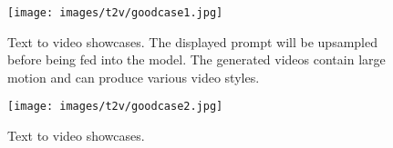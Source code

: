 \documentclass{article} \usepackage{iclr2024_conference,times}
\begin{document}
\begin{figure}[ht]
\begin{center}
\texttt{[image: images/t2v/goodcase1.jpg]}
\end{center}
\caption{Text to video showcases. The displayed prompt will be upsampled before being fed into the model. The generated videos contain large motion and can produce various video styles.}
\label{fig:t2vgood1}
\end{figure}

\begin{figure}[ht]
\begin{center}
\texttt{[image: images/t2v/goodcase2.jpg]}
\end{center}
\caption{Text to video showcases.}
\label{fig:t2vgood2}
\end{figure}
\end{document}
